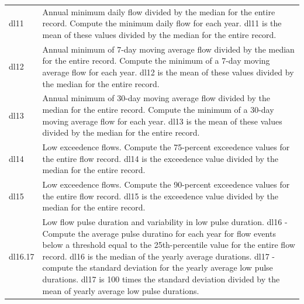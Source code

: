 \documentclass[a4paper,11pt]{article}\usepackage[]{graphicx}\usepackage[]{color}
\begin{document}
\begin{table}[ht]
\begin{threeparttable}[b]
\begin{tabularx}{\textwidth}{|l|X|}
  dl11 & Annual minimum daily flow divided by the median for the entire record. Compute the minimum daily flow for each year. dl11 is the mean of these values divided by the median for the entire record. \\
  dl12 & Annual minimum of 7-day moving average flow divided by the median for the entire record. Compute the minimum of a 7-day moving average flow for each year. dl12 is the mean of these values divided by the median for the entire record. \\
  dl13 & Annual minimum of 30-day moving average flow divided by the median for the entire record. Compute the minimum of a 30-day moving average flow for each year. dl13 is the mean of these values divided by the median for the entire record. \\
  dl14 & Low exceedence flows. Compute the 75-percent exceedence values for the entire flow record. dl14 is the exceedence value divided by the median for the entire record. \\
  dl15 & Low exceedence flows. Compute the 90-percent exceedence values for the entire flow record. dl15 is the exceedence value divided by the median for the entire record. \\
  dl16.17 & Low flow pulse duration and variability in low pulse duration. dl16 - Compute the average pulse duratino for each year for flow events below a threshold equal to the 25th-percentile value for the entire flow record. dl16 is the median of the yearly average durations. dl17 - compute the standard deviation for the yearly average low pulse durations. dl17 is 100 times the standard deviation divided by the mean of yearly average low pulse durations. \\
    \hline
  \end{tabularx}
  \end{threeparttable}
\end{table}
\end{document}
